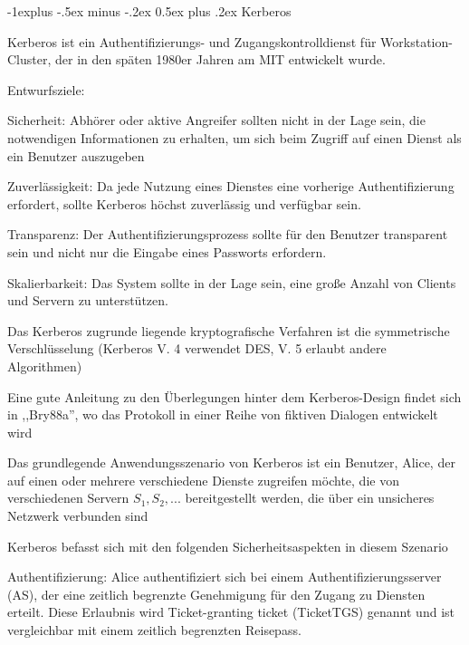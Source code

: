 \documentclass[a4paper]{article}
\makeatletter
\renewcommand{\subsection}{\@startsection{subsection}{2}{0mm}%
 {-1explus -.5ex minus -.2ex}%
 {0.5ex plus .2ex}%
 {\normalfont\normalsize\bfseries}}
\makeatother
\begin{document}
\begin{multicols}{3}
      \subsection{Kerberos}
      \begin{itemize*}
            \item Kerberos ist ein Authentifizierungs- und Zugangskontrolldienst für Workstation-Cluster, der in den späten 1980er Jahren am MIT entwickelt wurde.
            \item Entwurfsziele:
            \begin{itemize*}
                  \item Sicherheit: Abhörer oder aktive Angreifer sollten nicht in der Lage sein, die notwendigen Informationen zu erhalten, um sich beim Zugriff auf einen Dienst als ein Benutzer auszugeben
                  \item Zuverlässigkeit: Da jede Nutzung eines Dienstes eine vorherige Authentifizierung erfordert, sollte Kerberos höchst zuverlässig und verfügbar sein.
                  \item Transparenz: Der Authentifizierungsprozess sollte für den Benutzer transparent sein und nicht nur die Eingabe eines Passworts erfordern.
                  \item Skalierbarkeit: Das System sollte in der Lage sein, eine große Anzahl von Clients und Servern zu unterstützen.
            \end{itemize*}
            \item Das Kerberos zugrunde liegende kryptografische Verfahren ist die symmetrische Verschlüsselung (Kerberos V. 4 verwendet DES, V. 5 erlaubt andere Algorithmen)
            \item Eine gute Anleitung zu den Überlegungen hinter dem Kerberos-Design findet sich in ,,Bry88a'', wo das Protokoll in einer Reihe von fiktiven Dialogen entwickelt wird
            \item Das grundlegende Anwendungsszenario von Kerberos ist ein Benutzer, Alice, der auf einen oder mehrere verschiedene Dienste zugreifen möchte, die von verschiedenen Servern $S_1, S_2, ...$ bereitgestellt werden, die über ein unsicheres Netzwerk verbunden sind
            \item Kerberos befasst sich mit den folgenden Sicherheitsaspekten in diesem Szenario
            \begin{itemize*}
                  \item Authentifizierung: Alice authentifiziert sich bei einem Authentifizierungsserver (AS), der eine zeitlich begrenzte Genehmigung für den Zugang zu Diensten erteilt. Diese Erlaubnis wird Ticket-granting ticket (TicketTGS) genannt und ist vergleichbar mit einem zeitlich begrenzten Reisepass.

\end{itemize*}
\end{itemize*}
\end{multicols}
\end{document}
